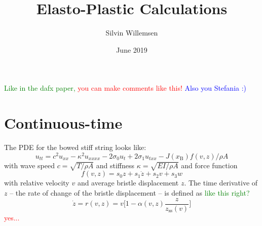 \documentclass{article}
\title{Elasto-Plastic Calculations}
\author{Silvin Willemsen}
\date{June 2019}
\def\SBcomment[#1]{\textcolor{Red}{#1}}
\def\SWcomment[#1]{\textcolor{Green}{#1}}
\def\SScomment[#1]{\textcolor{Blue}{#1}}
\begin{document}
\maketitle
\noindent\SWcomment[Like in the dafx paper, ]\SBcomment[you can make comments like this!] \SScomment[Also you Stefania :)]
\section{Continuous-time}\label{sec:continuous}
The PDE for the bowed stiff string looks like:
\begin{equation}
    u_{tt} = c^2u_{xx}-\kappa^2u_{xxxx}-2\sigma_0u_t+2\sigma_1u_{txx}-J(x_\text{B})f(v,z)/\rho A
\end{equation}
with wave speed $c = \sqrt{T/\rho A}$ and stiffness $\kappa = \sqrt{EI/\rho A}$ and force function
\begin{equation}
    f(v, z) = s_0z + s_1\dot z + s_2v + s_3w
\end{equation}
with relative velocity $v$ and average bristle displacement $z$. The time derivative of $z$ -- the rate of change of the bristle displacement -- is defined as \SWcomment[like this right?]{}
\begin{equation}\label{eq:zdot}
    \dot z = r(v,z) = v\bigg[1-\alpha(v, z)\frac{z}{z_\text{ss}(v)}\bigg]
\end{equation}
\SBcomment[yes...]
\end{document}
